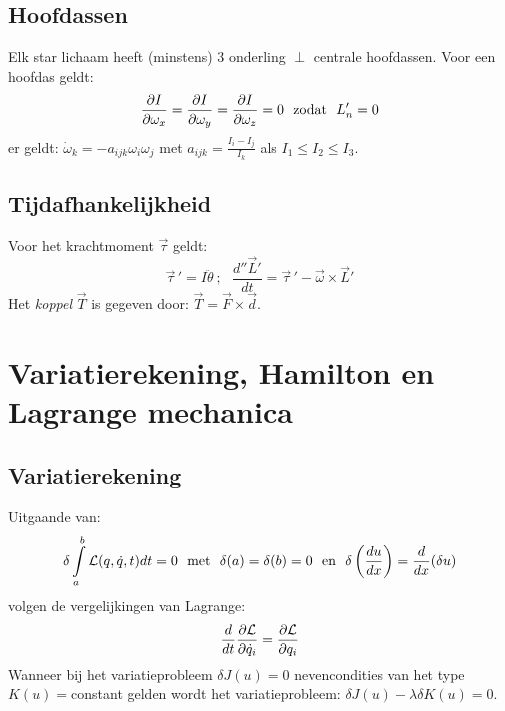 \subsection{Hoofdassen}
Elk star lichaam heeft (minstens) 3 onderling $\perp$ centrale hoofdassen.
Voor een hoofdas geldt:
\[
\frac{\partial I}{\partial \omega_x}=\frac{\partial I}{\partial \omega_y}=\frac{\partial I}{\partial \omega_z}=0~~\mbox{zodat}~~L'_n=0
\]
er geldt: $\dot{\omega}_k=-a_{ijk}\omega_i\omega_j$ met
$\displaystyle a_{ijk}=\frac{I_i-I_j}{I_k}$ als $I_1\leq I_2\leq I_3$.

\subsection{Tijdafhankelijkheid}
Voor het krachtmoment $\vec{\tau}$ geldt:
\[
\vec{\tau}\,'=I\ddot{\theta}~;~~~\frac{d''\vec{L}'}{dt}=\vec{\tau}\,'-\vec{\omega}\times\vec{L}'
\]
Het {\it koppel} $\vec{T}$ is gegeven door: $\vec{T}=\vec{F}\times\vec{d}$.

\section{Variatierekening, Hamilton en Lagrange mechanica}
\subsection{Variatierekening}
Uitgaande van:
\[
\delta\int\limits_a^b{\cal L}(q,\dot{q},t)dt=0\mbox{~~met~~}\delta(a)=\delta(b)=0\mbox{~~en~~}
\delta\left(\frac{du}{dx}\right)=\frac{d}{dx}(\delta u)
\]
volgen de vergelijkingen van Lagrange:
\[
\frac{d}{dt}\frac{\partial {\cal L}}{\partial \dot{q}_i}=\frac{\partial {\cal L}}{\partial q_i}
\]
Wanneer bij het variatieprobleem $\delta J(u)=0$ nevencondities van het type
$K(u)=$constant gelden wordt het variatieprobleem:
$\delta J(u)-\lambda\delta K(u)=0$.

